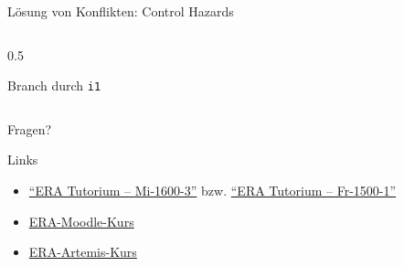 \begin{frame}[c, fragile]{Lösung von Konflikten: Control  Hazards}
\begin{columns}
\begin{column}[c]{0.5\textwidth}
{
			}

			\begin{center}
				Branch durch \texttt{i1}
			\end{center}
		\end{column}
	\end{columns}
\end{frame}

\begin{frame}[c, fragile]{}{}
	\begin{center}
		\LARGE Fragen?
	\end{center}
\end{frame}

\begin{frame}[c, fragile]{Links}{}
	\begin{itemize}
		\item \href{https://zulip.in.tum.de/#narrow/channel/3255-ERA-Tutorium-.E2.80.93-Mi-1600-3}{\enquote{ERA Tutorium -- Mi-1600-3}}
		      bzw. \href{https://zulip.in.tum.de/#narrow/channel/3264-ERA-Tutorium-.E2.80.93-Fr-1500-1}{\enquote{ERA Tutorium -- Fr-1500-1}}
		\item \href{https://www.moodle.tum.de/course/view.php?id=111440}{ERA-Moodle-Kurs}
		\item \href{https://artemis.tum.de/courses/516}{ERA-Artemis-Kurs}
	\end{itemize}
\end{frame}

\maketitle


